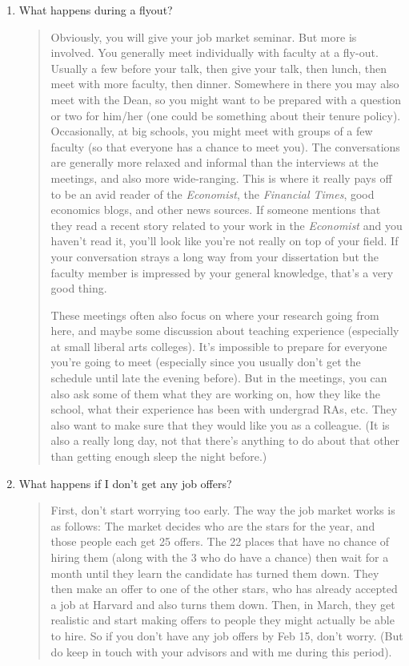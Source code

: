 \documentclass{\classes/econtex}
\begin{document}
\begin{enumerate}
\item  What happens during a flyout?
  \begin{quote}
    Obviously, you will give your job market seminar.  But more is
    involved.  You generally meet individually with faculty at a
    fly-out.  Usually a few before your talk, then give your talk, then
    lunch, then meet with more faculty, then dinner.  Somewhere in there
    you may also meet with the Dean, so you might want to be prepared
    with a question or two for him/her (one could be something about
    their tenure policy).  Occasionally, at big schools, you might meet
    with groups of a few faculty (so that everyone has a chance to meet
    you).  The conversations are generally more relaxed and informal
    than the interviews at the meetings, and also more wide-ranging.
    This is where it really pays off to be an avid reader of the \textit{Economist},
    the \textit{Financial Times}, good economics blogs, and other news sources.
    If someone mentions that they read a recent story related to your 
    work in the \textit{Economist} and you haven't read it, you'll look like
    you're not really on top of your field.  If your conversation strays
    a long way from your dissertation but the faculty member is impressed 
    by your general knowledge, that's a very good thing.

    These meetings often also focus on where your research going from
    here, and maybe some discussion about teaching experience (especially
    at small liberal arts colleges).  It's impossible to prepare for
    everyone you're going to meet (especially since you usually don't get
    the schedule until late the evening before).  But in the meetings, you
    can also ask some of them what they are working on, how they like the
    school, what their experience has been with undergrad RAs, etc.  They
    also want to make sure that they would like you as a colleague.  (It is
    also a really long day, not that there's anything to do about that other
    than getting enough sleep the night before.)



  \end{quote}

\item  {} 
  What happens if I don't get any job offers?
  \begin{quote}
    First, don't start worrying too early.  The way the job market works
    is as follows: The market decides who are the stars for the year, and
    those people each get 25 offers.  The 22 places that have no chance of
    hiring them (along with the 3 who do have a chance) then wait for a
    month until they learn the candidate has turned them down.  They then
    make an offer to one of the other stars, who has already accepted a
    job at Harvard and also turns them down.  Then, in March, they get
    realistic and start making offers to people they might actually be
    able to hire.  So if you don't have any job offers by Feb 15, don't
    worry.  (But do keep in touch with your advisors and with me during this
    period).


\end{quote}
\end{enumerate}
\end{document}
